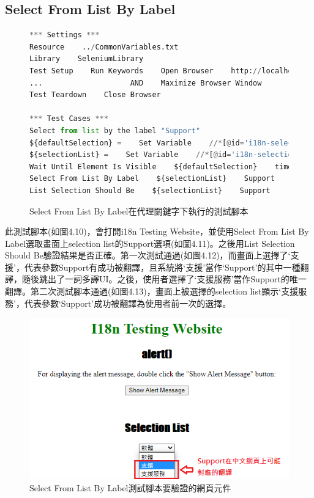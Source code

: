 \subsection{Select From List By Label}
\begin{figure}[H]
\begin{lstlisting}[language={python}]
*** Settings ***
Resource    ../CommonVariables.txt
Library    SeleniumLibrary
Test Setup    Run Keywords    Open Browser    http://localhost:3000    Chrome
...                    AND    Maximize Browser Window
Test Teardown    Close Browser

*** Test Cases ***
Select from list by the label "Support"
${defaultSelection} =    Set Variable    //*[@id='i18n-selection-list']//*[text()='Software' and @selected]
${selectionList} =    Set Variable    //*[@id='i18n-selection-list']
Wait Until Element Is Visible    ${defaultSelection}    timeout=${shortPeriodOfTime}
Select From List By Label    ${selectionList}    Support
List Selection Should Be    ${selectionList}    Support
\end{lstlisting}
\caption{Select From List By Label在代理關鍵字下執行的測試腳本}
\end{figure}
此測試腳本(如圖4.10)，會打開i18n Testing Website，並使用Select From List By Label選取畫面上selection list的Support選項(如圖4.11)。之後用List Selection Should Be驗證結果是否正確。第一次測試通過(如圖4.12)，而畫面上選擇了‘支援’，代表參數Support有成功被翻譯，且系統將‘支援’當作‘Support’的其中一種翻譯，隨後跳出了一詞多譯UI。之後，使用者選擇了‘支援服務’當作Support的唯一翻譯。第二次測試腳本通過(如圖4.13)，畫面上被選擇的selection list顯示‘支援服務’，代表參數‘Support’成功被翻譯為使用者前一次的選擇。

\begin{figure}[H]
\centering
\includegraphics[width= .6\textwidth]{../論文截圖/4-1-7 Select from list by label要驗證的網頁元件.png}
\caption{Select From List By Label測試腳本要驗證的網頁元件}
\end{figure}


